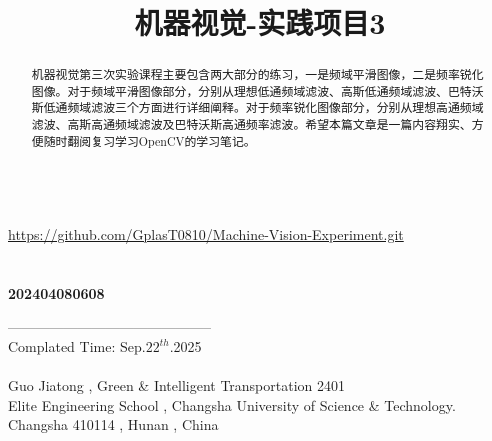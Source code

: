\documentclass[11pt]{article}
\title{\textbf{{\huge 机器视觉-实践项目3}}}
\begin{document}
    
    \maketitle
    
     \vspace*{4em}
    \begin{abstract}
    	机器视觉第三次实验课程主要包含两大部分的练习，一是频域平滑图像，二是频率锐化图像。对于频域平滑图像部分，分别从理想低通频域滤波、高斯低通频域滤波、巴特沃斯低通频域滤波三个方面进行详细阐释。对于频率锐化图像部分，分别从理想高通频域滤波、高斯高通频域滤波及巴特沃斯高通频率滤波。希望本篇文章是一篇内容翔实、方便随时翻阅复习学习OpenCV的学习笔记。
    \end{abstract}
    
    \begin{center}
    	\\\underline{https://github.com/GplasT0810/Machine-Vision-Experiment.git}\\
    	\\
    	\\
    	\vspace{0.7em}\textbf{{\large 202404080608}}\\
    \end{center}
    \newpage
    
    \tableofcontents
    \begin{center}
    	\vspace{12em}
    \end{center}
    
    \vspace*{13em}--------------------------------------------\\
    Complated Time: Sep.$22^{th}$.2025\\ \\
    Guo Jiatong , Green \& Intelligent Transportation 2401\\
    Elite Engineering School , Changsha University of Science \& Technology.\\
    Changsha 410114 , Hunan , China
    
\end{document}

